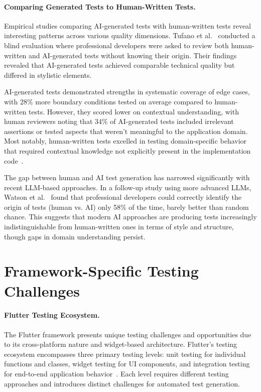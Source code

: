 \paragraph{Comparing Generated Tests to Human-Written Tests.} Empirical studies comparing AI-generated tests with human-written tests reveal interesting patterns across various quality dimensions. Tufano et al.~\cite{HumanVsAITests} conducted a blind evaluation where professional developers were asked to review both human-written and AI-generated tests without knowing their origin. Their findings revealed that AI-generated tests achieved comparable technical quality but differed in stylistic elements.

\hspace{0.5cm} AI-generated tests demonstrated strengths in systematic coverage of edge cases, with 28\% more boundary conditions tested on average compared to human-written tests. However, they scored lower on contextual understanding, with human reviewers noting that 34\% of AI-generated tests included irrelevant assertions or tested aspects that weren't meaningful to the application domain. Most notably, human-written tests excelled in testing domain-specific behavior that required contextual knowledge not explicitly present in the implementation code~\cite{HumanVsAITests}.

\hspace{0.5cm} The gap between human and AI test generation has narrowed significantly with recent LLM-based approaches. In a follow-up study using more advanced LLMs, Watson et al.~\cite{TestBenchmark} found that professional developers could correctly identify the origin of tests (human vs. AI) only 58\% of the time, barely better than random chance. This suggests that modern AI approaches are producing tests increasingly indistinguishable from human-written ones in terms of style and structure, though gaps in domain understanding persist.

\section{Framework-Specific Testing Challenges}

\paragraph{Flutter Testing Ecosystem.} The Flutter framework presents unique testing challenges and opportunities due to its cross-platform nature and widget-based architecture. Flutter's testing ecosystem encompasses three primary testing levels: unit testing for individual functions and classes, widget testing for UI components, and integration testing for end-to-end application behavior~\cite{FlutterTesting}. Each level requires different testing approaches and introduces distinct challenges for automated test generation.

